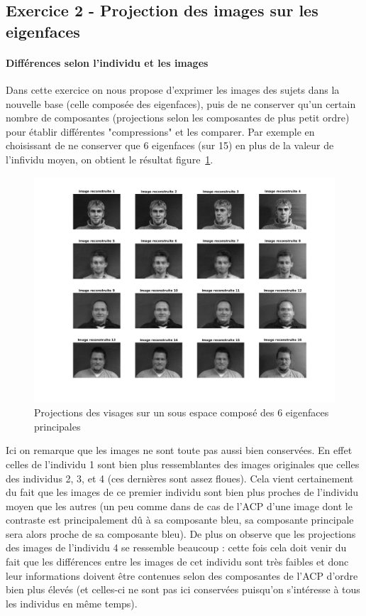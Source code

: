 \documentclass{article}
\begin{document}
\subsection{Exercice 2 - Projection des images sur les eigenfaces}
\paragraph{Différences selon l'individu et les images}
Dans cette exercice on nous propose d'exprimer les images des sujets dans la nouvelle base (celle composée des eigenfaces), puis de ne conserver qu'un certain nombre de composantes (projections selon les composantes de plus petit ordre) pour établir différentes "compressions" et les comparer. Par exemple en choisissant de ne conserver que 6 eigenfaces (sur 15) en plus de la valeur de l'infividu moyen, on obtient le résultat figure~\ref{proj_faces}.
\begin{figure}[ht]
    \begin{center}
        \includegraphics[width=0.9\linewidth]{images/2/2-2-res6.png}
        \caption{Projections des visages sur un sous espace composé des 6 eigenfaces principales}
        \label{proj_faces}
    \end{center}
\end{figure}
Ici on remarque que les images ne sont toute pas aussi bien conservées. En effet celles de l'individu 1 sont bien plus ressemblantes des images originales que celles des individus 2, 3, et 4 (ces dernières sont assez floues). Cela vient certainement du fait que les images de ce premier individu sont bien plus proches de l'individu moyen que les autres (un peu comme dans de cas de l'ACP d'une image dont le contraste est principalement dû à sa composante bleu, sa composante principale sera alors proche de sa composante bleu). De plus on observe que les projections des images de l'individu 4 se ressemble beaucoup : cette fois cela doit venir du fait que les différences entre les images de cet individu sont très faibles et donc leur informations doivent être contenues selon des composantes de l'ACP d'ordre bien plus élevés (et celles-ci ne sont pas ici conservées puisqu'on s'intéresse à tous les individus en même temps).
\end{document}
